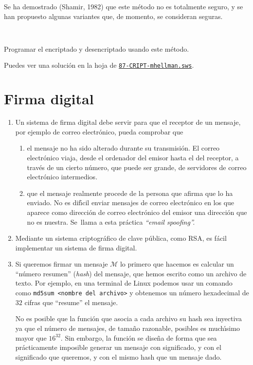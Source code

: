 Se ha demostrado (Shamir, 1982) que este m\'etodo no es totalmente seguro, y se
han propuesto algunas variantes que, de momento, se consideran seguras.

\

\begin{ejer}
Programar el encriptado y desencriptado usando este m\'etodo. 
\end{ejer}
Puedes ver una soluci\'on en la hoja de {\sage}
\href{http://sage.mat.uam.es:8888/home/pub/??/}{\tt 87-CRIPT-mhellman.sws}.

\section{Firma digital}
\begin{enumerate}
 \item Un sistema de {\sc firma digital} debe servir para que el receptor de un
mensaje, por ejemplo de correo electr\'onico,  pueda  comprobar que
\begin{enumerate}
 \item el mensaje no ha sido alterado durante su transmisi\'on. El correo
electr\'onico viaja,  desde el ordenador del emisor hasta el del receptor, a
trav\'es de un cierto n\'umero, que puede ser grande,  de servidores  de correo
electr\'onico intermedios. 
 \item que el mensaje realmente procede de la persona que afirma que lo ha
enviado. No es dif\'{\i}cil enviar mensajes de correo electr\'onico en los que
aparece como direcci\'on de correo electr\'onico del emisor una direcci\'on que
no es nuestra. Se~llama a esta pr\'actica {\itshape ``email spoofing''.}
\end{enumerate}

 \item Mediante un sistema criptogr\'afico de clave p\'ublica, como RSA,  es
f\'acil implementar un sistema de firma digital.

\item Si queremos firmar un mensaje $\mathcal{M}$ lo primero que hacemos es
calcular un ``n\'umero resumen'' ({\itshape hash}) del mensaje,  que hemos 
escrito
como un archivo de texto. Por ejemplo, en una terminal de Linux podemos usar un
comando como \verb=md5sum <nombre del archivo>= y 
obtenemos un n\'umero hexadecimal de $32$ cifras que ``resume'' el mensaje. 

No es posible que la funci\'on que asocia a cada archivo su hash sea inyectiva
ya que el n\'umero de mensajes, de tama\~no razonable,  posibles es
much\'{\i}simo mayor que $16^{32}$. Sin embargo, la funci\'on se dise\~na de
forma que sea pr\'acticamente imposible generar un mensaje con significado, y
con el significado que queremos, y con el mismo hash que un mensaje dado.


\end{enumerate}
